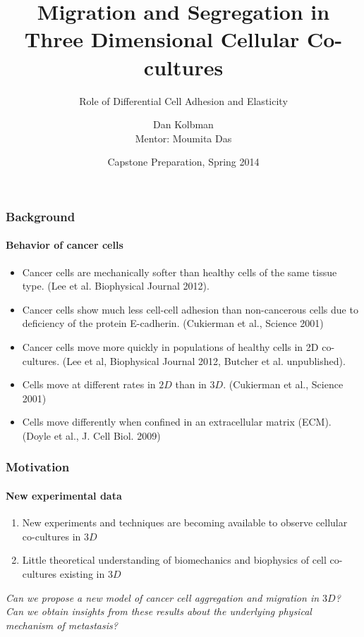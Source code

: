 \documentclass{beamer}
\begin{document}
  \title[Crisis] %
  {Migration and Segregation in Three Dimensional Cellular Co-cultures}
  \subtitle{Role of Differential Cell Adhesion and Elasticity}
  \author[Author, Kolbman] %
  {Dan Kolbman\\Mentor: Moumita Das}
  \date[2014]
  {Capstone Preparation, Spring 2014}
  \subject{info}


  \frame{\titlepage}
  
  \begin{frame}
    \frametitle{Background}
    \framesubtitle{Behavior of cancer cells}
    
    \begin{itemize}
    \item Cancer cells are mechanically softer than healthy cells of the same tissue type. 
    (Lee et al. Biophysical Journal 2012).
    \item Cancer cells show much less cell-cell adhesion than non-cancerous cells  due to deficiency of the protein E-cadherin. 
    (Cukierman et al., Science 2001)
    \item Cancer cells move more quickly in populations of healthy cells in 2D co-cultures. 
    (Lee et al, Biophysical Journal 2012, Butcher et al. unpublished).
    \item Cells move at different rates in $2D$ than in $3D$.
    (Cukierman et al., Science 2001)
    \item Cells move differently when confined in an extracellular matrix (ECM). 
    (Doyle et al., J. Cell Biol. 2009)       
    \end{itemize}
    \vfill
    
  \end{frame}  
  
  
  \begin{frame}
    \frametitle{Motivation}
    \framesubtitle{New experimental data}
    
    \begin{enumerate}
    \item New experiments and techniques are becoming available to observe cellular co-cultures in $3D$
    
    \item Little theoretical understanding of biomechanics and biophysics of cell co-cultures existing in $3D$
    \end{enumerate}
    
    \vspace{0.5in}
    
	\center\emph{Can we propose a new model of cancer cell aggregation and migration in $3D$? \\
	Can we obtain insights from these results about the underlying physical mechanism of metastasis?}
    
    \vfill
    
  \end{frame}
    
\end{document}
